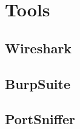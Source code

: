 \section{Tools}\label{sec:kaptiel}
\subsection{Wireshark}
\subsection{BurpSuite}
\subsection{PortSniffer}

